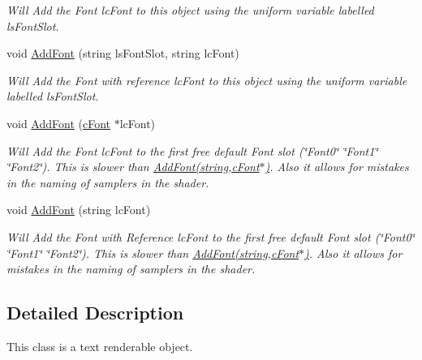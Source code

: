 \begin{DoxyCompactItemize}
\begin{DoxyCompactList}\small\item\em Will Add the Font lcFont to this object using the uniform variable labelled lsFontSlot. \end{DoxyCompactList}\item 
\hypertarget{classc_text_a9fa922feeb34018a9756ca2ef6f06fff}{
void \hyperlink{classc_text_a9fa922feeb34018a9756ca2ef6f06fff}{AddFont} (string lsFontSlot, string lcFont)}
\label{classc_text_a9fa922feeb34018a9756ca2ef6f06fff}

\begin{DoxyCompactList}\small\item\em Will Add the Font with reference lcFont to this object using the uniform variable labelled lsFontSlot. \end{DoxyCompactList}\item 
\hypertarget{classc_text_ae144cad4649fe01e6164c073b14b37ac}{
void \hyperlink{classc_text_ae144cad4649fe01e6164c073b14b37ac}{AddFont} (\hyperlink{classc_font}{cFont} $\ast$lcFont)}
\label{classc_text_ae144cad4649fe01e6164c073b14b37ac}

\begin{DoxyCompactList}\small\item\em Will Add the Font lcFont to the first free default Font slot (\char`\"{}Font0\char`\"{} \char`\"{}Font1\char`\"{} \char`\"{}Font2\char`\"{}). This is slower than \hyperlink{classc_text_ac44668d1b105b37f62e5386ce9c62969}{AddFont(string,cFont$\ast$)}. Also it allows for mistakes in the naming of samplers in the shader. \end{DoxyCompactList}\item 
\hypertarget{classc_text_aa9e8247389d16ace03973ae34cca343f}{
void \hyperlink{classc_text_aa9e8247389d16ace03973ae34cca343f}{AddFont} (string lcFont)}
\label{classc_text_aa9e8247389d16ace03973ae34cca343f}

\begin{DoxyCompactList}\small\item\em Will Add the Font with Reference lcFont to the first free default Font slot (\char`\"{}Font0\char`\"{} \char`\"{}Font1\char`\"{} \char`\"{}Font2\char`\"{}). This is slower than \hyperlink{classc_text_ac44668d1b105b37f62e5386ce9c62969}{AddFont(string,cFont$\ast$)}. Also it allows for mistakes in the naming of samplers in the shader. \end{DoxyCompactList}\end{DoxyCompactItemize}


\subsection{Detailed Description}
This class is a text renderable object. 